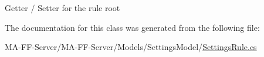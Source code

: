 Getter / Setter for the rule root 



The documentation for this class was generated from the following file\+:\begin{DoxyCompactItemize}
\item 
M\+A-\/\+F\+F-\/\+Server/\+M\+A-\/\+F\+F-\/\+Server/\+Models/\+Settings\+Model/\hyperlink{_settings_rule_8cs}{Settings\+Rule.\+cs}\end{DoxyCompactItemize}

